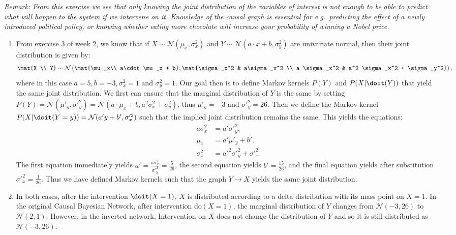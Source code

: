 \begin{enumerate}
\emph{Remark: From this exercise we see that only knowing the joint distribution of the variables of interest is not enough to be able to predict what will happen to the system if we intervene on it. Knowledge of the causal graph is essential for e.g.\ predicting the effect of a newly introduced political policy, or knowing whether eating more chocolate will increase your probability of winning a Nobel price.}

\begin{gradedsolution}
  \begin{enumerate}
    \item From exercise 3 of week 2, we know that if $X\sim\mathcal{N}(\mu_x,\sigma^2_x)$ and $Y\sim\mathcal{N}(a\cdot x+b, \sigma^2_y)$ are univariate normal, then their joint distribution is given by:
    \begin{align*}
      \mat{X \\ Y} \sim \mathcal{N}\left( \mat{\mu_x\\ a\cdot\mu_x + b}, \mat{\sigma_x^2 & a\sigma_x^2 \\ a \sigma_x^2 & a^2 \sigma_x^2 + \sigma_y^2}\right),
    \end{align*}
    where in this case $a=5, b = -3, \sigma^2_x=1$ and $\sigma^2_y=1$. Our goal then is to define Markov kernels $P(Y)$ and $P(X|\doit(Y))$ that yield the same joint distribution. We first can ensure that the marginal distribution of $Y$ is the same by setting $P(Y) = \mathcal{N}(\mu'_y, \sigma'^2_y) = \mathcal{N}(a\cdot\mu_x + b, a^2 \sigma_x^2 + \sigma_y^2)$, thus $\mu'_y=-3$ and $\sigma'^2_y=26$. Then we define the Markov kernel $P(X|\doit(Y=y)) = \mathcal{N}(a'y + b', \sigma'^2_x)$ such that the implied joint distribution remains the same. This yields the equations:
    \begin{align*}
      a\sigma_x^2 &= a' \sigma'^2_y,\\
      \mu_x &= a' \mu'_y + b',\\
      \sigma^2_x &= a'^2 \sigma'^2_y + \sigma'^2_x.
    \end{align*}
    The first equation immediately yields $a' = \frac{a\sigma_x^2}{\sigma'^2_y} = \frac{5}{26}$, the second equation yields $b' = \frac{15}{26}$, and the final equation yields after substitution $\sigma'^2_x = \frac{1}{26}$. Thus we have defined Markov kernels such that the graph $Y \rightarrow X$ yields the same joint distribution.
    \item In both cases, after the intervention $\doit(X=1)$, $X$ is distributed according to a delta distribution with its mass point on $X=1$. In the original Causal Bayesian Network, after intervention do$(X=1)$, the marginal distribution of $Y$ changes from $\mathcal{N}(-3,26)$ to $\mathcal{N}(2,1)$. However, in the inverted network, Intervention on $X$ does not change the distribution of $Y$ and so it is still distributed as $\mathcal{N}(-3,26)$.
  \end{enumerate}
\end{gradedsolution}


\end{enumerate}
